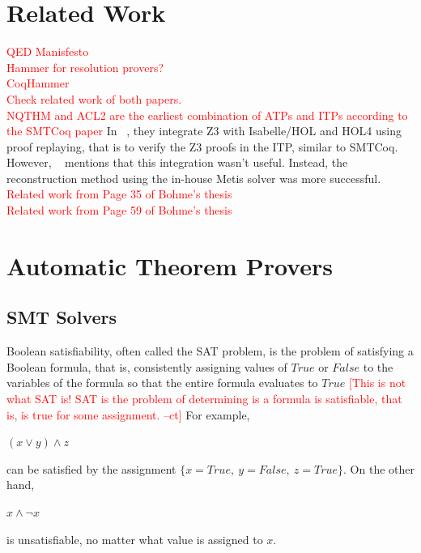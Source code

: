 \documentclass{article}
\newcommand{\rem}[1]{\textcolor{red}{[#1]}}
\newcommand{\ct}[1]{\rem{#1 --ct}}
\begin{document}
\section{Related Work}
\label{sec:rel}
	\textcolor{red}{QED Manisfesto}\\
	\textcolor{red}{Hammer for resolution provers?}\\
	\textcolor{red}{CoqHammer}\\
	\textcolor{red}{Check related work of both papers.}\\
	\textcolor{red}{NQTHM and ACL2 are the earliest combination of ATPs and ITPs according to the SMTCoq paper}
	In ~\cite{10.1007/978-3-642-14052-5_14}, they integrate 
	Z3 with Isabelle/HOL and HOL4 
	using proof replaying, that is to verify 
	the Z3 proofs in the ITP, similar to SMTCoq. However, 
	~\cite{10.1007/978-3-642-22438-6_11} mentions that this
	integration wasn't useful. Instead, the reconstruction 
	method using the in-house Metis solver was more 
	successful. \\
	\textcolor{red}{Related work from Page 35 of Bohme's thesis}\\
	\textcolor{red}{Related work from Page 59 of Bohme's thesis}\\
	
\section{Automatic Theorem Provers}
\label{sec:atp}	
\subsection{SMT Solvers}
\label{smt}
	Boolean satisfiability, often called the SAT problem, 
	is the problem of satisfying a Boolean formula, that is, 
	consistently assigning values of $True$ or $False$ 
	to the variables of the formula so that the entire 
	formula evaluates to $True$
	\ct{This is not what SAT is! SAT is the problem of determining is a formula is satisfiable, that is, is true for some assignment.}
	For example,
	\begin{center}$(x \lor y) \land z$ \end{center}
	can be satisfied by the 
	assignment $\{x=True,\ y=False,\ z=True\}$. On the other hand, 
	\begin{center} $x \land \neg x$ \end{center}
	is unsatisfiable, no matter what value is assigned to $x$.
	
\end{document}
